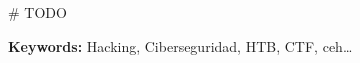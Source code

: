 \# TODO

\textbf{Keywords:} Hacking, Ciberseguridad, \acrlong{HTB}, \acrshort{CTF}, \acrlong{ceh}\ldots
